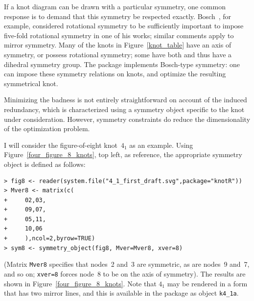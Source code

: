 \documentclass{birkjour}
\theoremstyle{definition}
\theoremstyle{remark}
\numberwithin{equation}{section}
\begin{document}
If a knot diagram can be drawn with a particular symmetry, one common
response is to demand that this symmetry be respected exactly.
Bosch~\cite{bosch2010}, for example, considered rotational symmetry to
be sufficiently important to impose five-fold rotational symmetry in
one of his works; similar comments apply to mirror symmetry.  Many of
the knots in Figure~\ref{knot_table} have an axis of symmetry, or
possess rotational symmetry; some have both and thus have a dihedral
symmetry group.  The package implements Bosch-type symmetry: one can
impose these symmetry relations on knots, and optimize the resulting
symmetrical knot.

Minimizing the badness is not entirely straightforward on account of
the induced redundancy, which is characterized using a symmetry object
specific to the knot under consideration.  However, symmetry
constraints do reduce the dimensionality of the optimization problem.

I will consider the figure-of-eight knot~$4_1$ as an example.  Using
Figure~\ref{four_figure_8_knots}, top left, as reference, the
appropriate symmetry object is defined as follows:

\begin{verbatim}
> fig8 <- reader(system.file("4_1_first_draft.svg",package="knotR"))
> Mver8 <- matrix(c(
+     02,03,
+     09,07,
+     05,11,
+     10,06
+     ),ncol=2,byrow=TRUE)
> sym8 <- symmetry_object(fig8, Mver=Mver8, xver=8)
\end{verbatim}

(Matrix {\tt Mver8} specifies that nodes~2 and~3 are symmetric, as are
nodes~9 and~7, and so on; {\tt xver=8} forces node~8 to be on the axis
of symmetry).  The results are shown in
Figure~\ref{four_figure_8_knots}.  Note that $4_1$ may be rendered in
a form that has two mirror lines, and this is available in the package
as object {\tt k4\_1a}.
\end{document}
